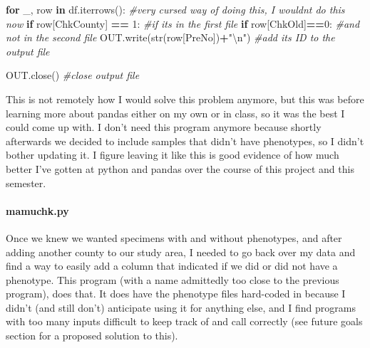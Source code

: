 \documentclass[
]{article}
\newenvironment{Shaded}{\begin{snugshade}}{\end{snugshade}}
\newcommand{\BuiltInTok}[1]{#1}
\newcommand{\CharTok}[1]{\textcolor[rgb]{0.31,0.60,0.02}{#1}}
\newcommand{\CommentTok}[1]{\textcolor[rgb]{0.56,0.35,0.01}{\textit{#1}}}
\newcommand{\ControlFlowTok}[1]{\textcolor[rgb]{0.13,0.29,0.53}{\textbf{#1}}}
\newcommand{\DecValTok}[1]{\textcolor[rgb]{0.00,0.00,0.81}{#1}}
\newcommand{\KeywordTok}[1]{\textcolor[rgb]{0.13,0.29,0.53}{\textbf{#1}}}
\newcommand{\NormalTok}[1]{#1}
\newcommand{\OperatorTok}[1]{\textcolor[rgb]{0.81,0.36,0.00}{\textbf{#1}}}
\newcommand{\StringTok}[1]{\textcolor[rgb]{0.31,0.60,0.02}{#1}}
\begin{document}
\begin{Shaded}
\begin{Highlighting}[]
\ControlFlowTok{for}\NormalTok{ \_, row }\KeywordTok{in}\NormalTok{ df.iterrows(): }\CommentTok{\#very cursed way of doing this, I wouldn\textquotesingle{}t do this now}
    \ControlFlowTok{if}\NormalTok{ row[}\StringTok{\textquotesingle{}ChkCounty\textquotesingle{}}\NormalTok{] }\OperatorTok{==} \DecValTok{1}\NormalTok{: }\CommentTok{\#if it\textquotesingle{}s in the first file}
        \ControlFlowTok{if}\NormalTok{ row[}\StringTok{\textquotesingle{}ChkOld\textquotesingle{}}\NormalTok{]}\OperatorTok{==}\DecValTok{0}\NormalTok{: }\CommentTok{\#and not in the second file}
\NormalTok{            OUT.write(}\BuiltInTok{str}\NormalTok{(row[PreNo])}\OperatorTok{+}\StringTok{"}\CharTok{\textbackslash{}n}\StringTok{"}\NormalTok{) }\CommentTok{\#add its ID to the output file}

\NormalTok{OUT.close() }\CommentTok{\#close output file}
\end{Highlighting}
\end{Shaded}

This is not remotely how I would solve this problem anymore, but this
was before learning more about pandas either on my own or in class, so
it was the best I could come up with. I don't need this program anymore
because shortly afterwards we decided to include samples that didn't
have phenotypes, so I didn't bother updating it. I figure leaving it
like this is good evidence of how much better I've gotten at python and
pandas over the course of this project and this semester.

\hypertarget{mamuchk.py}{%
\paragraph{mamuchk.py}\label{mamuchk.py}}

Once we knew we wanted specimens with and without phenotypes, and after
adding another county to our study area, I needed to go back over my
data and find a way to easily add a column that indicated if we did or
did not have a phenotype. This program (with a name admittedly too close
to the previous program), does that. It does have the phenotype files
hard-coded in because I didn't (and still don't) anticipate using it for
anything else, and I find programs with too many inputs difficult to
keep track of and call correctly (see future goals section for a
proposed solution to this).
\end{document}
